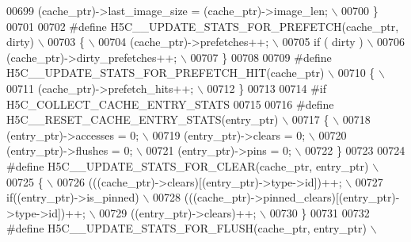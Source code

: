 \begin{DoxyCode}
00699 \textcolor{preprocessor}{    (cache\_ptr)->last\_image\_size = (cache\_ptr)->image\_len; \(\backslash\)}
00700 \textcolor{preprocessor}{\}}
00701 
00702 \textcolor{preprocessor}{#define H5C\_\_UPDATE\_STATS\_FOR\_PREFETCH(cache\_ptr, dirty) \(\backslash\)}
00703 \textcolor{preprocessor}{\{                                                        \(\backslash\)}
00704 \textcolor{preprocessor}{    (cache\_ptr)->prefetches++;                           \(\backslash\)}
00705 \textcolor{preprocessor}{    if ( dirty )                                         \(\backslash\)}
00706 \textcolor{preprocessor}{        (cache\_ptr)->dirty\_prefetches++;                 \(\backslash\)}
00707 \textcolor{preprocessor}{\}}
00708 
00709 \textcolor{preprocessor}{#define H5C\_\_UPDATE\_STATS\_FOR\_PREFETCH\_HIT(cache\_ptr) \(\backslash\)}
00710 \textcolor{preprocessor}{\{                                                     \(\backslash\)}
00711 \textcolor{preprocessor}{    (cache\_ptr)->prefetch\_hits++;                     \(\backslash\)}
00712 \textcolor{preprocessor}{\}}
00713 
00714 \textcolor{preprocessor}{#if H5C\_COLLECT\_CACHE\_ENTRY\_STATS}
00715 
00716 \textcolor{preprocessor}{#define H5C\_\_RESET\_CACHE\_ENTRY\_STATS(entry\_ptr) \(\backslash\)}
00717 \textcolor{preprocessor}{\{                                           \(\backslash\)}
00718 \textcolor{preprocessor}{    (entry\_ptr)->accesses = 0;              \(\backslash\)}
00719 \textcolor{preprocessor}{    (entry\_ptr)->clears   = 0;              \(\backslash\)}
00720 \textcolor{preprocessor}{    (entry\_ptr)->flushes  = 0;              \(\backslash\)}
00721 \textcolor{preprocessor}{    (entry\_ptr)->pins     = 0;              \(\backslash\)}
00722 \textcolor{preprocessor}{\}}
00723 
00724 \textcolor{preprocessor}{#define H5C\_\_UPDATE\_STATS\_FOR\_CLEAR(cache\_ptr, entry\_ptr)        \(\backslash\)}
00725 \textcolor{preprocessor}{\{                                                                \(\backslash\)}
00726 \textcolor{preprocessor}{    (((cache\_ptr)->clears)[(entry\_ptr)->type->id])++;            \(\backslash\)}
00727 \textcolor{preprocessor}{    if((entry\_ptr)->is\_pinned)                                   \(\backslash\)}
00728 \textcolor{preprocessor}{        (((cache\_ptr)->pinned\_clears)[(entry\_ptr)->type->id])++; \(\backslash\)}
00729 \textcolor{preprocessor}{    ((entry\_ptr)->clears)++;                                     \(\backslash\)}
00730 \textcolor{preprocessor}{\}}
00731 
00732 \textcolor{preprocessor}{#define H5C\_\_UPDATE\_STATS\_FOR\_FLUSH(cache\_ptr, entry\_ptr)         \(\backslash\)}

\end{DoxyCode}
